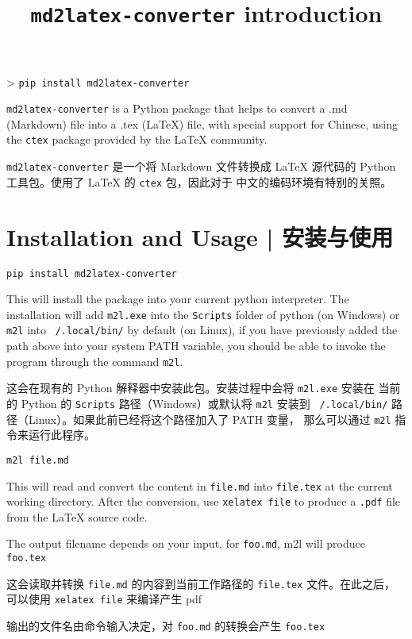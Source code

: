 \documentclass{ctexart}
\title{\texttt{md2latex-converter} introduction }
\begin{document}
	\maketitle

	> \texttt{pip install md2latex-converter}

	\texttt{md2latex-converter} is a Python package that helps to convert a .md (Markdown) file into a .tex (LaTeX) file, with special support for Chinese, using the \texttt{ctex} package provided by the LaTeX community.

	\texttt{md2latex-converter} 是一个将 Markdown 文件转换成 LaTeX 源代码的 Python 工具包。使用了 LaTeX 的 \texttt{ctex} 包，因此对于 中文的编码环境有特别的关照。

	\section{Installation and Usage | 安装与使用}

	\texttt{pip install md2latex-converter}

	This will install the package into your current python interpreter. The installation will add \texttt{m2l.exe} into the \texttt{Scripts} folder of python (on Windows) or \texttt{m2l} into \texttt{~/.local/bin/} by default (on Linux), if you have previously added the path above into your system PATH variable, you should be able to invoke the program through the command \texttt{m2l}.

	这会在现有的 Python 解释器中安装此包。安装过程中会将 \texttt{m2l.exe} 安装在 当前的 Python 的 \texttt{Scripts} 路径（Windows）或默认将 \texttt{m2l} 安装到 \texttt{~/.local/bin/} 路径（Linux）。如果此前已经将这个路径加入了 PATH 变量， 那么可以通过 \texttt{m2l} 指令来运行此程序。

	\texttt{m2l file.md}

	This will read and convert the content in \texttt{file.md} into \texttt{file.tex} at the current working directory. After the conversion, use \texttt{xelatex file} to produce a \texttt{.pdf} file from the LaTeX source code.

	The output filename depends on your input, for \texttt{foo.md}, m2l will produce \texttt{foo.tex}

	这会读取并转换 \texttt{file.md} 的内容到当前工作路径的 \texttt{file.tex} 文件。在此之后，可以使用 \texttt{xelatex file} 来编译产生 pdf

	输出的文件名由命令输入决定，对 \texttt{foo.md} 的转换会产生 \texttt{foo.tex}
\end{document}
